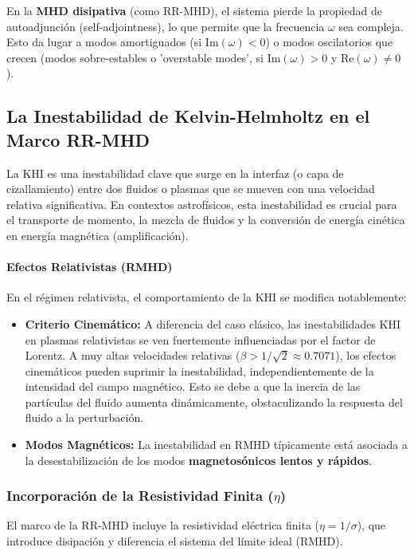 En la \textbf{MHD disipativa} (como RR-MHD), el sistema pierde la propiedad de autoadjunción (self-adjointness), lo que permite que la frecuencia $\omega$ sea compleja. Esto da lugar a modos amortiguados (si $\text{Im}(\omega) < 0$) o modos oscilatorios que crecen (modos sobre-estables o 'overstable modes', si $\text{Im}(\omega) > 0$ y $\text{Re}(\omega) \ne 0$).

\subsection{La Inestabilidad de Kelvin-Helmholtz en el Marco RR-MHD}

La KHI es una inestabilidad clave que surge en la interfaz (o capa de cizallamiento) entre dos fluidos o plasmas que se mueven con una velocidad relativa significativa. En contextos astrofísicos, esta inestabilidad es crucial para el transporte de momento, la mezcla de fluidos y la conversión de energía cinética en energía magnética (amplificación).

\paragraph{Efectos Relativistas (RMHD)}
En el régimen relativista, el comportamiento de la KHI se modifica notablemente:

\begin{itemize}
    \item \textbf{Criterio Cinemático:} A diferencia del caso clásico, las inestabilidades KHI en plasmas relativistas se ven fuertemente influenciadas por el factor de Lorentz. A muy altas velocidades relativas ($\beta > 1/\sqrt{2} \approx 0.7071$), los efectos cinemáticos pueden suprimir la inestabilidad, independientemente de la intensidad del campo magnético. Esto se debe a que la inercia de las partículas del fluido aumenta dinámicamente, obstaculizando la respuesta del fluido a la perturbación.
    \item \textbf{Modos Magnéticos:} La inestabilidad en RMHD típicamente está asociada a la desestabilización de los modos \textbf{magnetosónicos lentos y rápidos}.
\end{itemize}

\subsubsection{Incorporación de la Resistividad Finita ($\eta$)}

El marco de la RR-MHD incluye la resistividad eléctrica finita ($\eta = 1/\sigma$), que introduce disipación y diferencia el sistema del límite ideal (RMHD).

